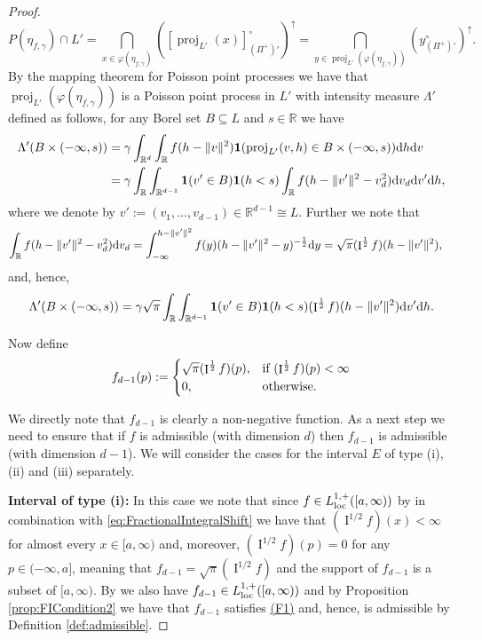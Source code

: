 \documentclass[11pt,a4paper]{article}
\theoremstyle{plain}
\theoremstyle{definition}
\theoremstyle{remark}
\def\RR{\mathbb{R}}
\newcommand{\dd}{{\rm d}}
\newcommand{\frI}{\mathop{\mathrm{I}}\nolimits}
\newcommand{\proj}{\operatorname{proj}}
\begin{document}
\begin{proof}
\begin{equation}
        P(\eta_{f,\gamma})\cap{L'}=\bigcap_{x\in\varphi(\eta_{f,\gamma})}([\proj_{L'}(x)]^{\circ}_{(\Pi^+)'})^{\uparrow}= \bigcap_{y\in\proj_{L'}(\varphi(\eta_{f,\gamma}))}(y^{\circ}_{(\Pi^+)'})^{\uparrow}.
    \end{equation}
    By the mapping theorem for Poisson point processes \cite[Theorem 5.1]{LP} we have that $\proj_{L'}(\varphi(\eta_{f,\gamma}))$ is a Poisson point process in $L'$ with intensity measure $\Lambda'$ defined as follows, for any Borel set $B \subseteq L$ and $s \in \RR$ we have
    \begin{align*}
        \Lambda'(B\times (-\infty, s))&= \gamma\int_{\RR^d} \int_{\RR} f(h-\|v\|^2) {\bf 1}(\proj_{L'}(v,h) \in B \times (-\infty,s)) \dd h \dd v\\
        &= \gamma\int_{\RR} \int_{\RR^{d-1}} {\bf 1}(v' \in B) {\bf 1}(h< s) \int_{\RR} f(h-\|v'\|^2-v_d^2)\dd v_d \dd v' \dd h,
    \end{align*}
    where we denote by $v':=(v_1,\dots,v_{d-1}) \in \RR^{d-1}\cong L$. Further we note that 
    \begin{align*}
        \int_{\RR} f(h-\|v'\|^2-v_d^2)\dd v_d&= \int_{-\infty}^{h-\|v'\|^2} f(y)(h-\|v'\|^2-y)^{-\frac{1}{2}}\dd y= \sqrt{\pi}(\frI^{1\over 2}f)(h-\|v'\|^2),
    \end{align*}
    and, hence, 
    \begin{equation}\label{eq:28.05.24_13}
     \Lambda'(B\times (-\infty, s))= \gamma\sqrt{\pi}\int_{\RR} \int_{\RR^{d-1}} {\bf 1}(v' \in B) {\bf 1}(h< s) (\frI^{1\over 2}f)(h-\|v'\|^2) \dd v' \dd h.
    \end{equation}
    
    Now define 
    \begin{align*}
        f_{d-1}(p):= 
        \begin{cases}
            \sqrt{\pi} (\frI^{1\over 2}f)(p), &\text{if } (\frI^{\frac{1}{2}}f)(p)<\infty\\
            0, &\text{otherwise}.
        \end{cases}
    \end{align*}
    
    We directly note that $f_{d-1}$ is clearly a non-negative function. As a next step we need to ensure that if $f$ is admissible (with dimension $d$) then $f_{d-1}$ is admissible (with dimension $d-1$). We will consider the cases for the interval $E$ of type (i), (ii) and (iii) separately.

    \medskip

    \textbf{Interval of type (i):} In this case we note that since $f\in L_{{\rm loc}}^{1,+}([a,\infty))$ by \cite[Lemma 2.1]{MARTINEZ1992111} in combination with \eqref{eq:FractionalIntegralShift} we have that $(\frI^{1/2}f)(x)<\infty$ for almost every $x\in [a,\infty)$ and,  moreover, $(\frI^{1/2}f)(p)=0$ for any $p\in (-\infty,a]$, meaning that $f_{d-1}=\sqrt{\pi} (\frI^{1/2}f)$ and the support of $f_{d-1}$ is a subset of $[a,\infty)$. By \cite[Lemma 2.1]{MARTINEZ1992111} we also have $f_{d-1}\in L_{{\rm loc}}^{1,+}([a,\infty))$ and by Proposition \ref{prop:FICondition2} we have that $f_{d-1}$ satisfies \hyperref[item:F1]{(F1)} and, hence, is admissible by Definition \ref{def:admissible}.


\end{proof}
\end{document}
